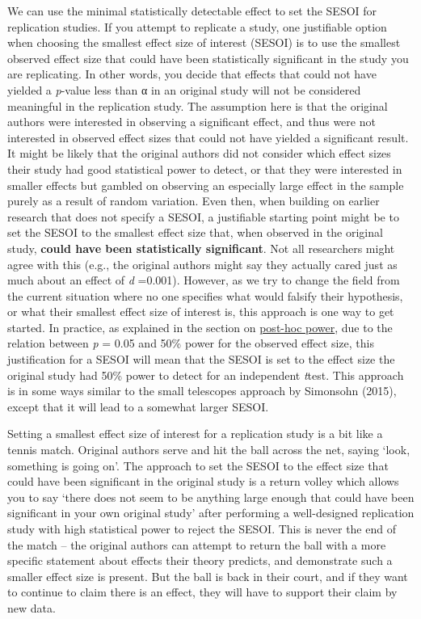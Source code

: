 \documentclass[
  oneside]{krantz}
\begin{document}
We can use the minimal statistically detectable effect to set the SESOI for replication studies. If you attempt to replicate a study, one justifiable option when choosing the smallest effect size of interest (SESOI) is to use the smallest observed effect size that could have been statistically significant in the study you are replicating. In other words, you decide that effects that could not have yielded a \emph{p}-value less than α in an original study will not be considered meaningful in the replication study. The assumption here is that the original authors were interested in observing a significant effect, and thus were not interested in observed effect sizes that could not have yielded a significant result. It might be likely that the original authors did not consider which effect sizes their study had good statistical power to detect, or that they were interested in smaller effects but gambled on observing an especially large effect in the sample purely as a result of random variation. Even then, when building on earlier research that does not specify a SESOI, a justifiable starting point might be to set the SESOI to the smallest effect size that, when observed in the original study, \textbf{could have been statistically significant}. Not all researchers might agree with this (e.g., the original authors might say they actually cared just as much about an effect of \emph{d} =0.001). However, as we try to change the field from the current situation where no one specifies what would falsify their hypothesis, or what their smallest effect size of interest is, this approach is one way to get started. In practice, as explained in the section on \protect\hyperlink{posthoc}{post-hoc power}, due to the relation between \emph{p} = 0.05 and 50\% power for the observed effect size, this justification for a SESOI will mean that the SESOI is set to the effect size the original study had 50\% power to detect for an independent \emph{t}test. This approach is in some ways similar to the small telescopes approach by Simonsohn (2015), except that it will lead to a somewhat larger SESOI.

Setting a smallest effect size of interest for a replication study is a bit like a tennis match. Original authors serve and hit the ball across the net, saying `look, something is going on'. The approach to set the SESOI to the effect size that could have been significant in the original study is a return volley which allows you to say `there does not seem to be anything large enough that could have been significant in your own original study' after performing a well-designed replication study with high statistical power to reject the SESOI. This is never the end of the match -- the original authors can attempt to return the ball with a more specific statement about effects their theory predicts, and demonstrate such a smaller effect size is present. But the ball is back in their court, and if they want to continue to claim there is an effect, they will have to support their claim by new data.
\end{document}
